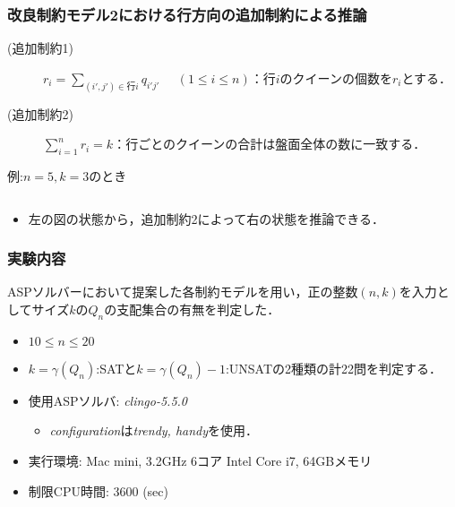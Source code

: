\documentclass[dvipdfmx,10pt]{beamer}
\begin{document}
%
%

\begin{frame}\frametitle{改良制約モデル2における行方向の追加制約による推論}
 \begin{block}{}
  \begin{description}
   \item[(追加制約1)] $r_{i}=\sum\limits_{(i',j')\in \mbox{行}i} q_{i'j'} \;\;\;\;\; (1 \leq i \leq n)$：行$i$のクイーンの個数を$r_i$とする．
   \item[(追加制約2)] $\sum\limits_{i=1}^{n}r_{i} = k$：行ごとのクイーンの合計は盤面全体の数に一致する．
  \end{description}
 \end{block}
 \begin{exampleblock}{例:$n=5,k=3$のとき}
  \begin{columns}
   \begin{column}{0.30\textwidth}
    \centering
    
   \end{column}
   \begin{column}{0.30\textwidth}
    \centering
    
   \end{column}
  \end{columns}
  \begin{itemize}
   \item 左の図の状態から，追加制約2によって右の状態を推論できる．
  \end{itemize}
 \end{exampleblock}
\end{frame}

%
%
 
\begin{frame}\frametitle{実験内容}
 \begin{block}{}
  ASPソルバーにおいて提案した各制約モデルを用い，正の整数$(n,k)$を入力としてサイズ$k$の$Q_{n}$の支配集合の有無を判定した．
  \begin{itemize}
   \item $10 \leq n \leq 20$
   \item $k=\gamma(Q_{n})$:SATと$k=\gamma(Q_{n})-1$:UNSATの2種類の計22問を判定する．
   \item 使用ASPソルバ: \textit{clingo-5.5.0}
	 \begin{itemize}
	  \item \textit{configuration}は\textit{trendy, handy}を使用．
	 \end{itemize}
   \item 実行環境: Mac mini, 3.2GHz 6コア Intel Core i7, 64GBメモリ
   \item 制限CPU時間: 3600 (sec)
  \end{itemize}
 \end{block}
\end{frame}
\end{document}
